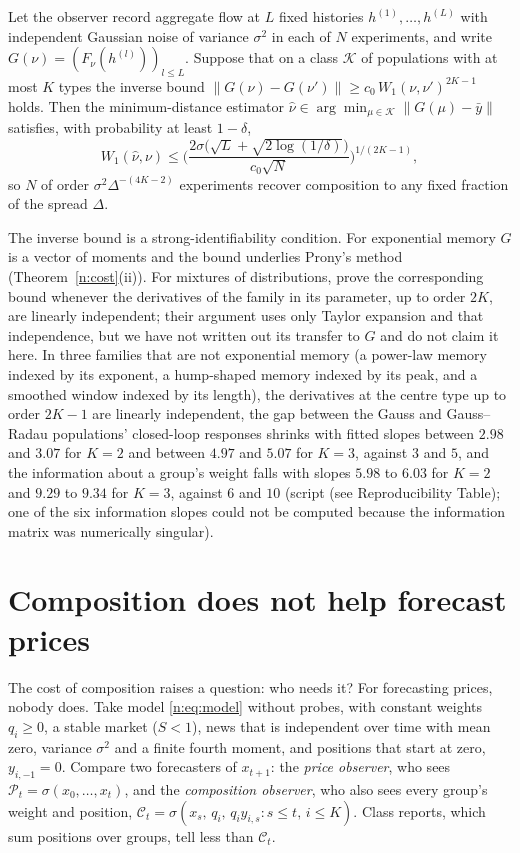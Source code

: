 \begin{proposition}\label{n:univup}
Let the observer record aggregate flow at $L$ fixed histories $h^{(1)},\ldots,h^{(L)}$ with independent Gaussian noise of variance $\sigma^2$ in each of $N$ experiments, and write $G(\nu)=(F_\nu(h^{(l)}))_{l\le L}$. Suppose that on a class $\mathcal K$ of populations with at most $K$ types the inverse bound $\|G(\nu)-G(\nu')\|\ge c_0\,W_1(\nu,\nu')^{2K-1}$ holds. Then the minimum-distance estimator $\hat\nu\in\arg\min_{\mu\in\mathcal K}\|G(\mu)-\bar y\|$ satisfies, with probability at least $1-\delta$,
\[
W_1(\hat\nu,\nu)\le\Big(\frac{2\sigma\big(\sqrt L+\sqrt{2\log(1/\delta)}\big)}{c_0\sqrt N}\Big)^{1/(2K-1)},
\]
so $N$ of order $\sigma^2\Delta^{-(4K-2)}$ experiments recover composition to any fixed fraction of the spread $\Delta$.
\end{proposition}

The inverse bound is a strong-identifiability condition. For exponential memory $G$ is a vector of moments and the bound underlies Prony's method (Theorem~\ref{n:cost}(ii)). For mixtures of distributions, \citet{heinrich2018} prove the corresponding bound whenever the derivatives of the family in its parameter, up to order $2K$, are linearly independent; their argument uses only Taylor expansion and that independence, but we have not written out its transfer to $G$ and do not claim it here. In three families that are not exponential memory (a power-law memory indexed by its exponent, a hump-shaped memory indexed by its peak, and a smoothed window indexed by its length), the derivatives at the centre type up to order $2K-1$ are linearly independent, the gap between the Gauss and Gauss--Radau populations' closed-loop responses shrinks with fitted slopes between $2.98$ and $3.07$ for $K=2$ and between $4.97$ and $5.07$ for $K=3$, against $3$ and $5$, and the information about a group's weight falls with slopes $5.98$ to $6.03$ for $K=2$ and $9.29$ to $9.34$ for $K=3$, against $6$ and $10$ (script (see Reproducibility Table); one of the six information slopes could not be computed because the information matrix was numerically singular).

\section{Composition does not help forecast prices}\label{n:irr_sec}

The cost of composition raises a question: who needs it? For forecasting prices, nobody does. Take model \eqref{n:eq:model} without probes, with constant weights $q_i\ge0$, a stable market ($S<1$), news that is independent over time with mean zero, variance $\sigma^2$ and a finite fourth moment, and positions that start at zero, $y_{i,-1}=0$. Compare two forecasters of $x_{t+1}$: the \emph{price observer}, who sees $\mathcal P_t=\sigma(x_0,\ldots,x_t)$, and the \emph{composition observer}, who also sees every group's weight and position, $\mathcal C_t=\sigma(x_s,\,q_i,\,q_iy_{i,s}:s\le t,\,i\le K)$. Class reports, which sum positions over groups, tell less than $\mathcal C_t$.

